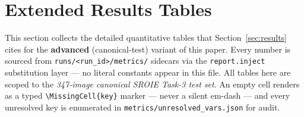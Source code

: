 \section{Extended Results Tables}
\label{sec:results_tables}

This section collects the detailed quantitative tables that
Section~\ref{sec:results} cites for the \textbf{advanced} (canonical-test) variant
of this paper.  Every number is sourced from
\texttt{runs/<run\_id>/metrics/} sidecars via the
\texttt{report.inject} substitution layer --- no literal constants
appear in this file.  All tables here are scoped to the
\emph{347-image canonical SROIE Task-3 test set}.  An empty cell
renders as a typed \texttt{\textbackslash MissingCell\{key\}} marker
--- never a silent em-dash --- and every unresolved key is
enumerated in \texttt{metrics/unresolved\_vars.json} for audit.

\begin{table}[t]
\centering
\caption{Headline per-field F1 (\%) on the canonical SROIE Task-3
         test set (347 images).  DONUT (end-to-end,
         $\approx$\,\,M parameters) vs.\ the
         YOLO+TrOCR+Attention-Assigner pipeline
         ($\approx$\,\,M$+$\,\,K
         parameters).}
\label{tab:headline_f1}
\small
{}
\end{table}

\begin{table}[t]
\centering
\caption{Extended per-field metrics (P, R, F1, exact-match) for
         DONUT and the learned-assigner pipeline on the
         347-image Task-3 test set.  Bootstrap 95\% CIs are
         paired across the two systems
         (CI $[\VAR{delta_f1_ci_lo},\,\VAR{delta_f1_ci_hi}]$ on the
         $\Delta$F1 row); McNemar $p=$.}
\label{tab:extended}
\scriptsize
{}
\end{table}

\begin{table}[t]
\centering
\caption{Latency and cost per image, per system.  Mean and
         percentiles in ms; throughput images/s at batch size~1;
         USD/image is the amortised cost on the reported hardware.
         Cells render as a typed \texttt{\textbackslash
         MissingCell\{$\cdot$\}} marker when the latency producer
         (\texttt{core.metrics\_latency}) did not run on this build.}
\label{tab:latency}
\small
{}
\end{table}

